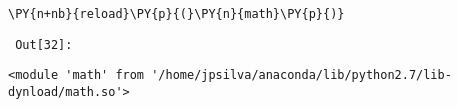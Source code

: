 {\par%
\vspace{-1\baselineskip}%
}%
\begin{notebookcell}[32]%
\begin{addmargin}[\cellleftmargin]{0em}%
{\smaller%
\par%
%
\vspace{-1\smallerfontscale}%
\begin{Verbatim}[commandchars=\\\{\}]
\PY{n+nb}{reload}\PY{p}{(}\PY{n}{math}\PY{p}{)}
\end{Verbatim}
%
\par%
\vspace{-1\smallerfontscale}}%
\end{addmargin}
\end{notebookcell}

\par\vspace{1\smallerfontscale}%
    
        {\par%
        \vspace{-1\smallerfontscale}%
        \noindent%
        \begin{minipage}{\cellleftmargin}%
    \hfill%
    {\smaller%
    \tt%
    \color{nbframe-out-prompt}%
    Out[32]:}%
    \hspace{\inputpadding}%
    \hspace{0em}%
    \hspace{3pt}%
    \end{minipage}%
        }%
    \begin{addmargin}[\cellleftmargin]{0em}%
    {\smaller%
    \vspace{-1\smallerfontscale}%
    
    
    
    \begin{verbatim}
<module 'math' from '/home/jpsilva/anaconda/lib/python2.7/lib-dynload/math.so'>
    \end{verbatim}

    
}%
    \end{addmargin}%

